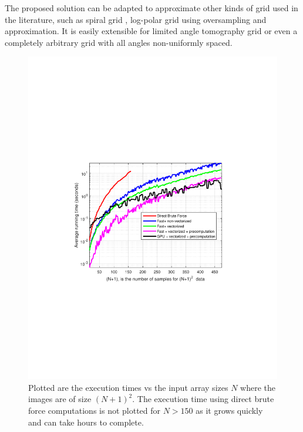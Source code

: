 \documentclass{UCF_ETD}
\begin{document}
   The proposed solution can be adapted to approximate other kinds of grid used in the literature, such as spiral grid \cite{Lustig2004}, log-polar grid \cite{Pan2009} using oversampling and approximation. It is easily extensible for limited angle tomography grid
 or even a completely arbitrary grid with all angles non-uniformly spaced.
 
 \begin{figure}[H]
 \begin{center}
 \includegraphics[scale=0.9]{PolarSphericalDFT/ImagesRunningTime}
 \caption{Plotted are the execution times vs the input array sizes $N$ where the images are of size $(N+1)^2$. The execution time using direct brute force computations is not plotted for $N > 150$ as it grows quickly and can take hours to complete.  }
 \label{ImagesRunningTime.fig}
 \end{center}
 \end{figure}
 
 
 
\end{document}
